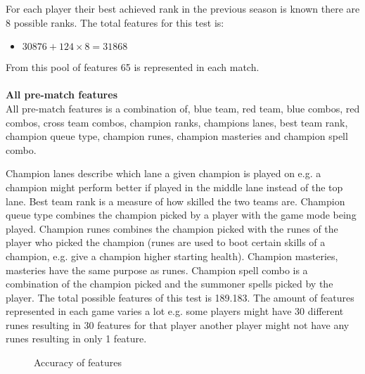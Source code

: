 For each player their best achieved rank in the previous season is known there are 8 possible ranks. The total features for this test is: 
\begin{itemize}
\item $30876 + 124\times8 = 31868$
\end{itemize}
From this pool of features 65 is represented in each match. \\\\
\textbf{All pre-match features}\\
All pre-match features is a combination of, blue team, red team, blue combos, red combos, cross team combos, champion ranks, champions lanes, best team rank, champion queue type, champion runes, champion masteries and champion spell combo.  

Champion lanes describe which lane a given champion is played on e.g. a champion might perform better if played in the middle lane instead of the top lane. Best team rank is a measure of how skilled the two teams are. Champion queue type combines the champion picked by a player with the game mode being played. Champion runes combines the champion picked with the runes of the player who picked the champion (runes are used to boot certain skills of a champion, e.g. give a champion higher starting health). Champion masteries, masteries have the same purpose as runes. Champion spell combo is a combination of the champion picked and the summoner spells picked by the player. The total possible features of this test is 189.183. The amount of features represented in each game varies a lot e.g. some players might have 30 different runes resulting in 30 features for that player another player might not have any runes resulting in only 1 feature.
\begin{figure}[!htb]
  \centering
   \caption{Accuracy of features}\label{fig:cluster-feat}
\end{figure}

